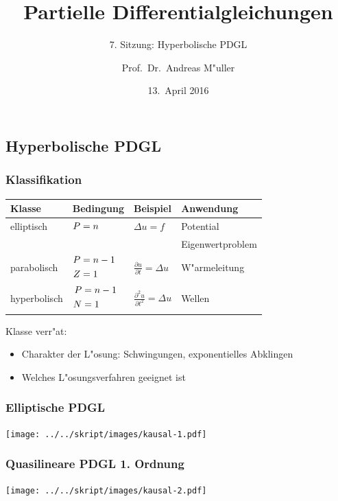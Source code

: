 \documentclass{beamer}
\title[]{Partielle Differentialgleichungen}
\subtitle{7. Sitzung: Hyperbolische PDGL}
\date[13.~April 2016]{13.~April 2016}
\author{Prof.~Dr.~Andreas M"uller}
\begin{document}
\begin{frame}
\section{Hyperbolische PDGL}
\titlepage
\end{frame}

\begin{frame}
\frametitle{Klassifikation}

\begin{center}
\begin{tabular}{llll}
Klasse&Bedingung&Beispiel&Anwendung\\
\hline
elliptisch &$\begin{aligned}P&=n\mathstrut\end{aligned}$
	&$\displaystyle \Delta u=f                                $
		&Potential\\
&	&	&Eigenwertproblem\\
\hline
parabolisch&%
$\begin{aligned}P&=n-1\mathstrut\\Z&=1\mathstrut\end{aligned}$
	&$\displaystyle \frac{\partial u}{\partial t}=\Delta u    $
		&W"armeleitung\\
\hline
hyperbolisch&%
$\begin{aligned}P&=n-1\mathstrut\\N&=1\mathstrut\end{aligned}$
	&$\displaystyle \frac{\partial^2 u}{\partial t^2}=\Delta u$
		&Wellen\\
\hline
\end{tabular}
\end{center}

Klasse verr"at:
\begin{itemize}
\item Charakter der L"osung: Schwingungen, exponentielles Abklingen
\item Welches L"osungsverfahren geeignet ist
\end{itemize}

\end{frame}

\begin{frame}
\frametitle{Elliptische PDGL}
\begin{center}
\texttt{[image: ../../skript/images/kausal-1.pdf]}
\end{center}
\end{frame}

\begin{frame}
\frametitle{Quasilineare PDGL 1. Ordnung}
\begin{center}
\texttt{[image: ../../skript/images/kausal-2.pdf]}
\end{center}
\end{frame}
\end{document}
